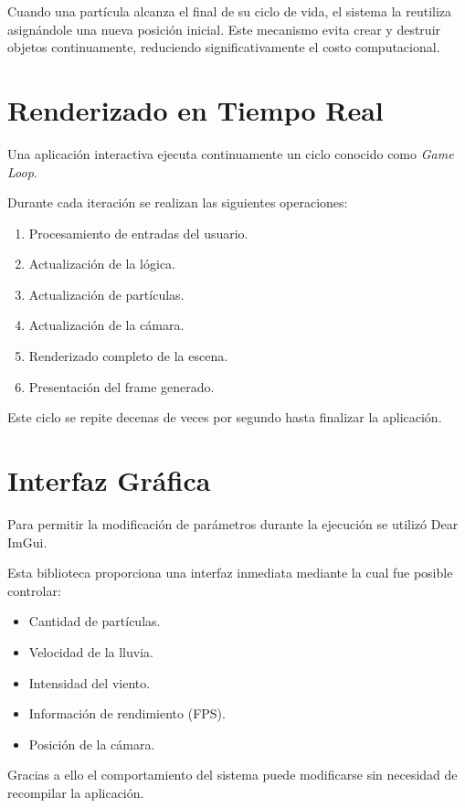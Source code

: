 Cuando una partícula alcanza el final de su ciclo de vida, el sistema la reutiliza asignándole una nueva posición inicial. Este mecanismo evita crear y destruir objetos continuamente, reduciendo significativamente el costo computacional.

\section{Renderizado en Tiempo Real}

Una aplicación interactiva ejecuta continuamente un ciclo conocido como \textit{Game Loop}.

Durante cada iteración se realizan las siguientes operaciones:

\begin{enumerate}
\item Procesamiento de entradas del usuario.
\item Actualización de la lógica.
\item Actualización de partículas.
\item Actualización de la cámara.
\item Renderizado completo de la escena.
\item Presentación del frame generado.
\end{enumerate}

Este ciclo se repite decenas de veces por segundo hasta finalizar la aplicación.

\section{Interfaz Gráfica}

Para permitir la modificación de parámetros durante la ejecución se utilizó Dear ImGui.

Esta biblioteca proporciona una interfaz inmediata mediante la cual fue posible controlar:

\begin{itemize}
\item Cantidad de partículas.
\item Velocidad de la lluvia.
\item Intensidad del viento.
\item Información de rendimiento (FPS).
\item Posición de la cámara.
\end{itemize}

Gracias a ello el comportamiento del sistema puede modificarse sin necesidad de recompilar la aplicación.

